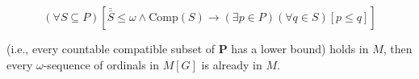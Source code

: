 $$(\forall S \subseteq P)[\bar{\bar{S}} \leq \omega \land \text{Comp}(S) \rightarrow (\exists p \in P)(\forall q \in S)[p \leq q]]$$

(i.e., every countable compatible subset of $\mathbf{P}$ has a lower bound) holds in $M$, then every $\omega$-sequence of ordinals in $M[G]$ is already in $M$.
